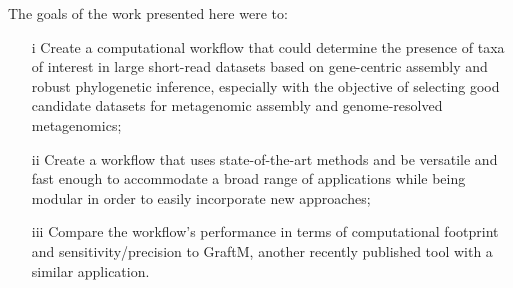 \documentclass{bioinfo}
\begin{document}
The goals of the work presented here were to: 
\begin{enumerate}
\item[i] Create a computational workflow that could determine the presence of taxa of interest in large short-read datasets based on gene-centric assembly and robust phylogenetic inference, especially with the objective of selecting good candidate datasets for metagenomic assembly and genome-resolved metagenomics;
\item[ii] Create a workflow that uses state-of-the-art methods and be versatile and fast enough to accommodate a broad range of applications while being modular in order to easily incorporate new approaches;
\item[iii] Compare the workflow’s performance in terms of computational footprint and sensitivity/precision to GraftM, another recently published tool with a similar application.
\end{enumerate}
\end{document}
